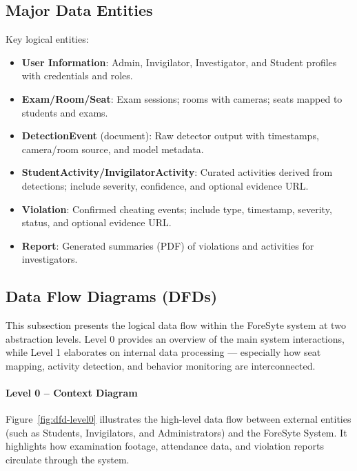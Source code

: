 \subsection{Major Data Entities}
Key logical entities:
\begin{itemize}
  \item \textbf{User Information}: Admin, Invigilator, Investigator, and Student profiles with credentials and roles.
  \item \textbf{Exam/Room/Seat}: Exam sessions; rooms with cameras; seats mapped to students and exams.
  \item \textbf{DetectionEvent} (document): Raw detector output with timestamps, camera/room source, and model metadata.
  \item \textbf{StudentActivity/InvigilatorActivity}: Curated activities derived from detections; include severity, confidence, and optional evidence URL.
  \item \textbf{Violation}: Confirmed cheating events; include type, timestamp, severity, status, and optional evidence URL.
  \item \textbf{Report}: Generated summaries (PDF) of violations and activities for investigators.
\end{itemize}
\vspace{-0.5em} %

\subsection{Data Flow Diagrams (DFDs)}
\vspace{-0.25em} %

This subsection presents the logical data flow within the ForeSyte system at two abstraction levels.
Level 0 provides an overview of the main system interactions, while Level 1 elaborates on internal data processing — especially how seat mapping, activity detection, and behavior monitoring are interconnected.

\paragraph{Level 0 – Context Diagram}
Figure~\ref{fig:dfd-level0} illustrates the high-level data flow between external entities (such as Students, Invigilators, and Administrators) and the ForeSyte System. It highlights how examination footage, attendance data, and violation reports circulate through the system.


